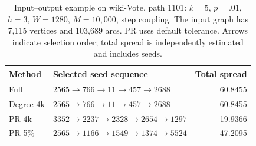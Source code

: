 \begin{table}[htbp]
\caption{Input--output example on wiki-Vote, path 1101: $k=5$, $p=.01$, $h=3$, $W=1280$, $M=10,000$, step coupling. The input graph has 7,115 vertices and 103,689 arcs. PR uses default tolerance. Arrows indicate selection order; total spread is independently estimated and includes seeds.}\label{tab:case}
\begin{tabularx}{\linewidth}{lXr}\toprule
Method & Selected seed sequence & Total spread \\ \midrule
Full & $2565\to 766\to 11\to 457\to 2688$ & 60.8455 \\
Degree-4k & $2565\to 766\to 11\to 457\to 2688$ & 60.8455 \\
PR-4k & $3352\to 2237\to 2328\to 2654\to 1297$ & 19.9366 \\
PR-5\% & $2565\to 1166\to 1549\to 1374\to 5524$ & 47.2095 \\
\bottomrule\end{tabularx}
\end{table}